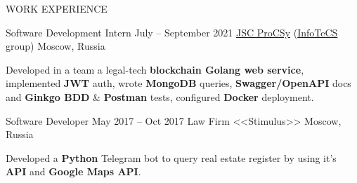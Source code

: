 \documentclass{resume}
\begin{document}
\begin{rSection}{WORK EXPERIENCE}
    \begin{rSubsection}
        {Software Development Intern}
            {July -- September 2021}
        {\href{https://procsy.ru}{JSC ProCSy} (\href{https://infotecs.ru/}{InfoTeCS} group)}
            {Moscow, Russia}

    \item Developed in a team a legal-tech \textbf{blockchain Golang web
      service}, implemented \textbf{JWT} auth, wrote \textbf{MongoDB} queries,
      \textbf{Swagger/OpenAPI} docs and \textbf{Ginkgo BDD} \& \textbf{Postman}
      tests, configured \textbf{Docker} deployment.
    \end{rSubsection}

    \begin{rSubsection}
        {Software Developer}
            {May 2017 -- Oct 2017}
        {Law Firm <<Stimulus>>}
            {Moscow, Russia}

    \item Developed a \textbf{Python} Telegram bot to query real estate register by using it's \textbf{API} and \textbf{Google Maps API}.
    \end{rSubsection}
\end{rSection}
\end{document}
